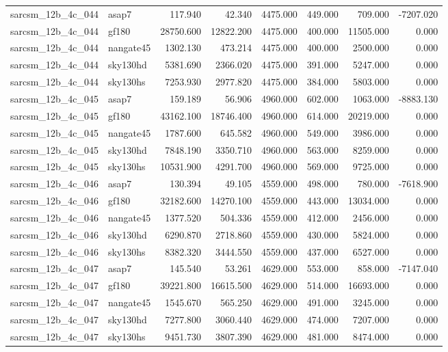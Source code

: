 \begin{tabular}{llrrrrrr}
sarcsm\_12b\_4c\_044 & asap7 & 117.940 & 42.340 & 4475.000 & 449.000 & 709.000 & -7207.020 \\
sarcsm\_12b\_4c\_044 & gf180 & 28750.600 & 12822.200 & 4475.000 & 400.000 & 11505.000 & 0.000 \\
sarcsm\_12b\_4c\_044 & nangate45 & 1302.130 & 473.214 & 4475.000 & 400.000 & 2500.000 & 0.000 \\
sarcsm\_12b\_4c\_044 & sky130hd & 5381.690 & 2366.020 & 4475.000 & 391.000 & 5247.000 & 0.000 \\
sarcsm\_12b\_4c\_044 & sky130hs & 7253.930 & 2977.820 & 4475.000 & 384.000 & 5803.000 & 0.000 \\
sarcsm\_12b\_4c\_045 & asap7 & 159.189 & 56.906 & 4960.000 & 602.000 & 1063.000 & -8883.130 \\
sarcsm\_12b\_4c\_045 & gf180 & 43162.100 & 18746.400 & 4960.000 & 614.000 & 20219.000 & 0.000 \\
sarcsm\_12b\_4c\_045 & nangate45 & 1787.600 & 645.582 & 4960.000 & 549.000 & 3986.000 & 0.000 \\
sarcsm\_12b\_4c\_045 & sky130hd & 7848.190 & 3350.710 & 4960.000 & 563.000 & 8259.000 & 0.000 \\
sarcsm\_12b\_4c\_045 & sky130hs & 10531.900 & 4291.700 & 4960.000 & 569.000 & 9725.000 & 0.000 \\
sarcsm\_12b\_4c\_046 & asap7 & 130.394 & 49.105 & 4559.000 & 498.000 & 780.000 & -7618.900 \\
sarcsm\_12b\_4c\_046 & gf180 & 32182.600 & 14270.100 & 4559.000 & 443.000 & 13034.000 & 0.000 \\
sarcsm\_12b\_4c\_046 & nangate45 & 1377.520 & 504.336 & 4559.000 & 412.000 & 2456.000 & 0.000 \\
sarcsm\_12b\_4c\_046 & sky130hd & 6290.870 & 2718.860 & 4559.000 & 430.000 & 5824.000 & 0.000 \\
sarcsm\_12b\_4c\_046 & sky130hs & 8382.320 & 3444.550 & 4559.000 & 437.000 & 6527.000 & 0.000 \\
sarcsm\_12b\_4c\_047 & asap7 & 145.540 & 53.261 & 4629.000 & 553.000 & 858.000 & -7147.040 \\
sarcsm\_12b\_4c\_047 & gf180 & 39221.800 & 16615.500 & 4629.000 & 514.000 & 16693.000 & 0.000 \\
sarcsm\_12b\_4c\_047 & nangate45 & 1545.670 & 565.250 & 4629.000 & 491.000 & 3245.000 & 0.000 \\
sarcsm\_12b\_4c\_047 & sky130hd & 7277.800 & 3060.440 & 4629.000 & 474.000 & 7207.000 & 0.000 \\
sarcsm\_12b\_4c\_047 & sky130hs & 9451.730 & 3807.390 & 4629.000 & 481.000 & 8474.000 & 0.000 \\

\end{tabular}
